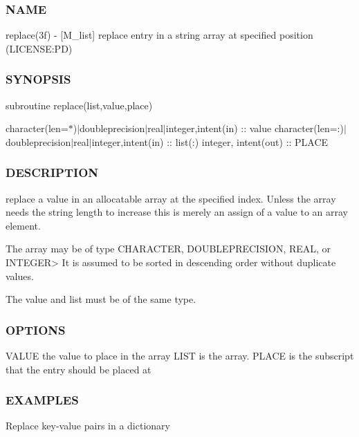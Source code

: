 \subsubsection*{N\+A\+ME}

replace(3f) -\/ \mbox{[}M\+\_\+list\mbox{]} replace entry in a string array at specified position (L\+I\+C\+E\+N\+SE\+:PD) 

\subsubsection*{S\+Y\+N\+O\+P\+S\+IS}

subroutine replace(list,value,place)

character(len=$\ast$)$\vert$doubleprecision$\vert$real$\vert$integer,intent(in) \+:\+: value character(len=\+:)$\vert$doubleprecision$\vert$real$\vert$integer,intent(in) \+:\+: list(\+:) integer, intent(out) \+:\+: P\+L\+A\+CE

\subsubsection*{D\+E\+S\+C\+R\+I\+P\+T\+I\+ON}

\begin{DoxyVerb}replace a value in an allocatable array at the specified index. Unless the
array needs the string length to increase this is merely an assign of a value
to an array element.

The array may be of type CHARACTER, DOUBLEPRECISION, REAL, or INTEGER>
It is assumed to be sorted in descending order without duplicate values.

The value and list must be of the same type.
\end{DoxyVerb}


\subsubsection*{O\+P\+T\+I\+O\+NS}

\begin{DoxyVerb}VALUE         the value to place in the array
LIST          is the array.
PLACE         is the subscript that the entry should be placed at
\end{DoxyVerb}


\subsubsection*{E\+X\+A\+M\+P\+L\+ES}

Replace key-\/value pairs in a dictionary


